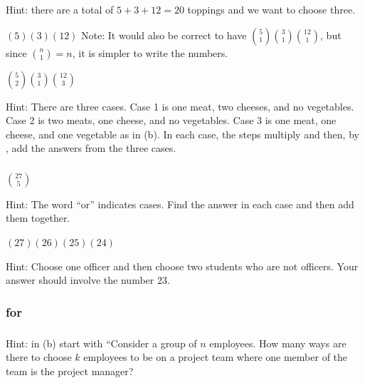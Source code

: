 \subsubsection*{ \answers}
    \begin{apart}
        \item Hint: there are a total of $5+3+12=20$ toppings and we want to choose three.
        \item $(5)(3)(12)$ Note: It would also be correct to have $\binom{5}{1}\binom{3}{1}\binom{12}{1}$, but since $\binom{n}{1}=n$, it is simpler to write the numbers.
        \item $\binom{5}{2}\binom{3}{1}\binom{12}{3}$
        \item Hint: There are three cases. Case 1 is one meat, two cheeses, and no vegetables.  Case 2 is two meats, one cheese, and no vegetables.  Case 3 is one meat, one cheese, and one vegetable as in (b).  In each case, the steps multiply and then, by , add the answers from the three cases.
    \end{apart}

\subsubsection*{ \answers}
    \begin{apart}
        \item $\binom{27}{5}$
        \item Hint: The word ``or'' indicates cases. Find the answer in each case and then add them together.
        \item $(27)(26)(25)(24)$  
        \item Hint: Choose one officer and then choose two students who are not officers.  Your answer should involve the number 23.
    \end{apart}


\subsubsection{\answers for 
\subproofscountnosums}

\subsubsection*{ \answers}
    Hint: in (b) start with ``Consider a group of $n$ employees. How many ways are there to choose $k$ employees to be on a project team where one member of the team is the project manager?

